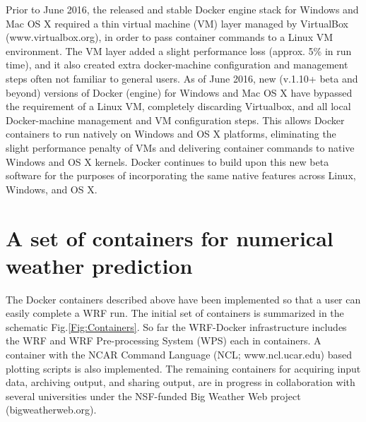 \documentclass[final]{ametsoc}
\begin{document}
%
%
%

Prior to June 2016, the released and stable Docker engine stack for Windows and Mac OS X required a thin virtual machine (VM) layer managed by VirtualBox (www.virtualbox.org), in order to pass container commands to a Linux VM environment.
The VM layer added a slight performance loss (approx. 5\% in run time), and it also created extra docker-machine configuration and management steps often not familiar to general users. As of June 2016, new (v.1.10+ beta and beyond) versions of Docker (engine) for Windows and Mac OS X have bypassed the requirement of a Linux VM, completely discarding Virtualbox, and all local Docker-machine management and VM configuration steps. This allows Docker containers to run natively on Windows and OS X platforms, eliminating the slight performance penalty of VMs and delivering container commands to native Windows and OS X kernels. Docker continues to build upon this new beta software for the purposes of incorporating the same native features across Linux, Windows, and OS X.

\section{A set of containers for numerical weather prediction}\label{sec:WRFcontainers}

The Docker containers described above have been implemented so that a user can easily complete a WRF run. The initial set of containers is summarized in the schematic Fig.\@ \ref{Fig:Containers}. So far the WRF-Docker infrastructure includes the WRF and WRF Pre-processing System (WPS) each in containers. A container with the NCAR Command Language (NCL; www.ncl.ucar.edu) based plotting scripts is also implemented. The remaining containers for acquiring input data, archiving output, and sharing output, are in progress in collaboration with several universities under the NSF-funded Big Weather Web project (bigweatherweb.org).   
\end{document}
